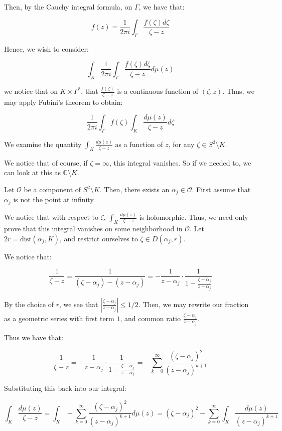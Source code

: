\documentclass[10pt]{article}
\begin{document}
Then, by the Cauchy integral formula, on $\Gamma$, we have that:

$$ f(z) = \frac{1}{2\pi i} \int_\Gamma \frac{f(\zeta) d\zeta}{\zeta - z}$$

Hence, we wish to consider:

$$ \int_K \frac{1}{2\pi i} \int_\Gamma \frac{f(\zeta) d\zeta}{\zeta - z} d\mu(z) $$

we notice that on $K \times \Gamma^*$, that $\frac{f(\zeta)}{\zeta - z} $ is a continuous function of $(\zeta, z)$. Thus, we may apply Fubini’s theorem to obtain:

$$  \frac{1}{2\pi i} \int_\Gamma f(\zeta) \int_K \frac{d\mu(z)}{\zeta - z} d\zeta $$

We examine the quantity $\int_K \frac{d\mu(z)}{\zeta - z} $ as a function of $z$, for any $\zeta \in S^2 \setminus K$.

We notice that of course, if $\zeta = \infty$, this integral vanishes. So if we needed to, we can look at this as $\mathbb{C} \setminus K$.

Let $\mathcal{O}$ be a component of $S^2 \setminus K$. Then, there exists an $\alpha_j \in \mathcal{O}$. First assume that $\alpha_j$ is not the point at infinity.

We notice that with respect to $\zeta$, $\int_K \frac{d\mu(z)}{\zeta - z}$ is holomorphic. Thus, we need only prove that this integral vanishes on some neighborhood in $\mathcal{O}$. Let $2r = \text{dist}(\alpha_j, K)$, and restrict ourselves to $\zeta \in D(\alpha_j, r)$. 

We notice that:

$$ \frac{1}{ \zeta  -z} = \frac{1}{(\zeta - \alpha_j) - (z - \alpha_j)} = - \frac{1}{z - \alpha_j} \cdot \frac{1}{1 - \frac{\zeta - \alpha_j}{z - \alpha_j}}$$

By the choice of $r$, we see that $\left|\frac{\zeta - \alpha_j}{z - \alpha_j}\right| \leq 1/2$. Then, we may rewrite our fraction as a geometric series with first term $1$, and common ratio $\frac{\zeta - \alpha_j}{z - \alpha_j}$.

Thus we have that:

$$ \frac{1}{ \zeta  -z} = - \frac{1}{z - \alpha_j} \cdot \frac{1}{1 - \frac{\zeta - \alpha_j}{z - \alpha_j}} = -\sum_{k=0}^\infty \frac{(\zeta - \alpha_j)^2}{(z - \alpha_j)^{k+1}} $$

Substituting this back into our integral:

$$\int_K \frac{d\mu(z)}{\zeta - z} = \int_K -\sum_{k=0}^\infty \frac{(\zeta - \alpha_j)^2}{(z - \alpha_j)^{k+1}}  d\mu(z)  = (\zeta - \alpha_j)^2  -\sum_{k=0}^\infty  \int_K \frac{d\mu(z)}{(z - \alpha_j)^{k+1}}$$
\end{document}
